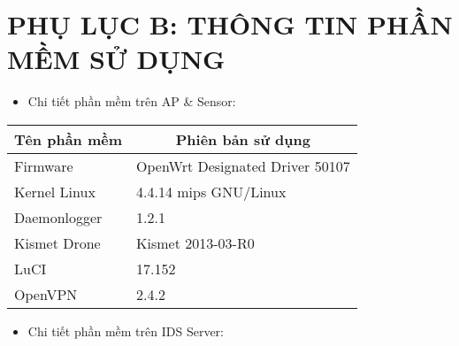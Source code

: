 \chapter*{PHỤ LỤC B: THÔNG TIN PHẦN MỀM SỬ DỤNG}

\renewcommand{\baselinestretch}{1.3}
\begin{itemize}
\item Chi tiết phần mềm trên AP \& Sensor:
\end{itemize}

\begin{table}[H]
\centering
\small
\setlength{\extrarowheight}{1pt}
\begin{tabular}{|p{3.5cm}|p{9cm}|}
\hline
\multicolumn{1}{|c|}{\textbf{Tên phần mềm}} & \multicolumn{1}{c|}{\textbf{Phiên bản sử dụng}} \\ \hline
Firmware                                    & OpenWrt Designated Driver 50107                 \\ \hline
Kernel Linux                                & 4.4.14 mips GNU/Linux                           \\ \hline
Daemonlogger                                & 1.2.1                                           \\ \hline
Kismet Drone                                & Kismet 2013-03-R0                               \\ \hline
LuCI                                        & 17.152                                          \\ \hline
OpenVPN                                     & 2.4.2                                           \\ \hline
\end{tabular}
\end{table}

\begin{itemize}
\item Chi tiết phần mềm trên IDS Server:
\end{itemize}

